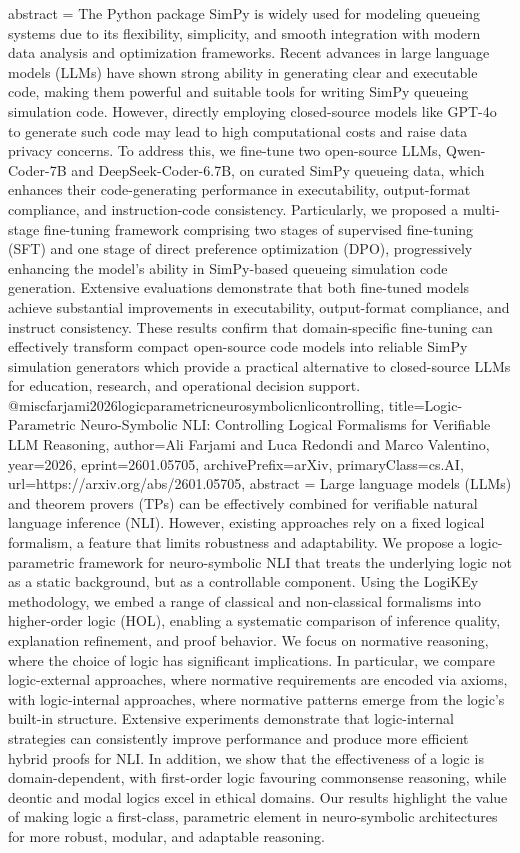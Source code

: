 {      abstract = {The Python package SimPy is widely used for modeling queueing systems due to its flexibility, simplicity, and smooth integration with modern data analysis and optimization frameworks. Recent advances in large language models (LLMs) have shown strong ability in generating clear and executable code, making them powerful and suitable tools for writing SimPy queueing simulation code. However, directly employing closed-source models like GPT-4o to generate such code may lead to high computational costs and raise data privacy concerns. To address this, we fine-tune two open-source LLMs, Qwen-Coder-7B and DeepSeek-Coder-6.7B, on curated SimPy queueing data, which enhances their code-generating performance in executability, output-format compliance, and instruction-code consistency. Particularly, we proposed a multi-stage fine-tuning framework comprising two stages of supervised fine-tuning (SFT) and one stage of direct preference optimization (DPO), progressively enhancing the model's ability in SimPy-based queueing simulation code generation. Extensive evaluations demonstrate that both fine-tuned models achieve substantial improvements in executability, output-format compliance, and instruct consistency. These results confirm that domain-specific fine-tuning can effectively transform compact open-source code models into reliable SimPy simulation generators which provide a practical alternative to closed-source LLMs for education, research, and operational decision support.}
}@misc{farjami2026logicparametricneurosymbolicnlicontrolling,
      title={Logic-Parametric Neuro-Symbolic NLI: Controlling Logical Formalisms for Verifiable LLM Reasoning}, 
      author={Ali Farjami and Luca Redondi and Marco Valentino},
      year={2026},
      eprint={2601.05705},
      archivePrefix={arXiv},
      primaryClass={cs.AI},
      url={https://arxiv.org/abs/2601.05705},
      abstract = {Large language models (LLMs) and theorem provers (TPs) can be effectively combined for verifiable natural language inference (NLI). However, existing approaches rely on a fixed logical formalism, a feature that limits robustness and adaptability. We propose a logic-parametric framework for neuro-symbolic NLI that treats the underlying logic not as a static background, but as a controllable component. Using the LogiKEy methodology, we embed a range of classical and non-classical formalisms into higher-order logic (HOL), enabling a systematic comparison of inference quality, explanation refinement, and proof behavior. We focus on normative reasoning, where the choice of logic has significant implications. In particular, we compare logic-external approaches, where normative requirements are encoded via axioms, with logic-internal approaches, where normative patterns emerge from the logic's built-in structure. Extensive experiments demonstrate that logic-internal strategies can consistently improve performance and produce more efficient hybrid proofs for NLI. In addition, we show that the effectiveness of a logic is domain-dependent, with first-order logic favouring commonsense reasoning, while deontic and modal logics excel in ethical domains. Our results highlight the value of making logic a first-class, parametric element in neuro-symbolic architectures for more robust, modular, and adaptable reasoning.}
}
